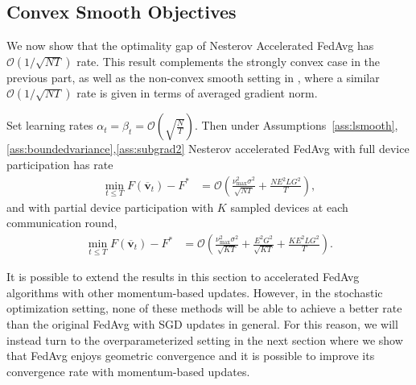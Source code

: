 \subsection{Convex Smooth Objectives}

We now show that the optimality gap of Nesterov Accelerated FedAvg has $\mathcal{O}(1/\sqrt{NT})$ rate. This result complements the strongly convex case in the previous
part, as well as the non-convex smooth setting in \cite{huo2020faster,yu2019linear,li2018federated},
where a similar $\mathcal{O}(1/\sqrt{NT})$ rate is given in terms
of averaged gradient norm. 
\begin{theorem}
	\label{thm:Nesterov_cvx}Set learning rates $\alpha_{t}=\beta_{t}=\mathcal{O}(\sqrt{\frac{N}{T}})$. Then under Assumptions~\ref{ass:lsmooth},\ref{ass:boundedvariance},\ref{ass:subgrad2} Nesterov accelerated FedAvg with
	full device participation has rate
	\begin{align*}
	\min_{t\leq T}F(\overline{\mathbf{v}}_{t})-F^{\ast} & =\mathcal{O}\left(\frac{\nu_{\max}^{2}\sigma^{2}}{\sqrt{NT}}+\frac{NE^{2}LG^{2}}{T}\right),
	\end{align*}
	and with partial device participation with $K$ sampled devices at
	each communication round, 
	\begin{align*}
	\min_{t\leq T}F(\overline{\mathbf{v}}_{t})-F^{\ast} & =\mathcal{O}\left(\frac{\nu_{\max}^{2}\sigma^{2}}{\sqrt{KT}}+\frac{E^{2}G^{2}}{\sqrt{KT}}+\frac{KE^{2}LG^{2}}{T}\right).
	\end{align*}
\end{theorem}
%
	It is possible to extend the results in this section to accelerated
    FedAvg algorithms with other momentum-based updates. However, in the
    stochastic optimization setting, none of these methods will be able
    to achieve a better rate than the original FedAvg with SGD updates in general.
    For this reason, we will instead turn to the overparameterized setting
    \cite{ma2017power,liu2018accelerating,canziani2016analysis} in the
    next section where we show that FedAvg enjoys geometric convergence
    and it is possible to improve its convergence rate with momentum-based updates.
